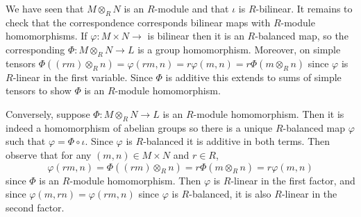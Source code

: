 \documentclass[12pt, a4paper, twoside, openright, titlepage]{book}
\begin{document}
\begin{proof*}{}{}
    We have seen that $M\otimes_RN$ is an $R$-module and that $\iota$ is $R$-bilinear. It remains to check that the correspondence corresponds bilinear maps with $R$-module homomorphisms. If $\varphi:M\times N\rightarrow$ is bilinear then it is an $R$-balanced map, so the corresponding $\Phi:M\otimes_RN\rightarrow L$ is a group homomorphism. Moreover, on simple tensors $\Phi((rm)\otimes_Rn) = \varphi(rm,n) = r\varphi(m,n) = r\Phi(m\otimes_Rn)$ since $\varphi$ is $R$-linear in the first variable. Since $\Phi$ is additive this extends to sums of simple tensors to show $\Phi$ is an $R$-module homomorphism.

    Conversely, suppose $\Phi:M\otimes_RN\rightarrow L$ is an $R$-module homomorphism. Then it is indeed a homomorphism of abelian groups so there is a unique $R$-balanced map $\varphi$ such that $\varphi = \Phi\circ \iota$. Since $\varphi$ is $R$-balanced it is additive in both terms. Then observe that for any $(m,n) \in M\times N$ and $r \in R$, \begin{equation*}
        \varphi(rm,n) = \Phi((rm)\otimes_Rn) = r\Phi(m\otimes_Rn) = r\varphi(m,n)
    \end{equation*}
    since $\Phi$ is an $R$-module homomorphism. Then $\varphi$ is $R$-linear in the first factor, and since $\varphi(m,rn) = \varphi(rm,n)$ since $\varphi$ is $R$-balanced, it is also $R$-linear in the second factor.
\end{proof*}
\end{document}
